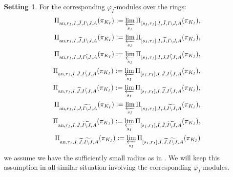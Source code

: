 \documentclass[12pt]{amsart}
\theoremstyle{definition}
\numberwithin{equation}{section}
\newtheorem{setting}[theorem]{Setting}
\begin{document}
\begin{setting}
For the corresponding $\varphi_I$-modules over the rings:
\begin{align}
\Pi_{\mathrm{an},r_I,I,\breve{J},I\backslash J,A}(\pi_{K_I}):=\varprojlim_{s_I}\Pi_{[s_I,r_I],I,\breve{J},I\backslash J,A}(\pi_{K_I}),\\	
\Pi_{\mathrm{an},r_I,I,\widetilde{J},I\backslash J,A}(\pi_{K_I}):=\varprojlim_{s_I} \Pi_{[s_I,r_I],I,\widetilde{J},I\backslash J,A}(\pi_{K_I}),\\
\Pi_{\mathrm{an},r_I,I,J,\breve{I\backslash J},A}(\pi_{K_I}):=\varprojlim_{s_I}\Pi_{[s_I,r_I],I,J,\breve{I\backslash J},A}(\pi_{K_I}),\\	
\Pi_{\mathrm{an},r_I,I,\breve{J},\breve{I\backslash J},A}(\pi_{K_I}):=\varprojlim_{s_I} \Pi_{[s_I,r_I],I,\breve{J},\breve{I\backslash J},A}(\pi_{K_I}),\\	
\Pi_{\mathrm{an},r_I,I,\widetilde{J},\breve{I\backslash J},A}(\pi_{K_I}):=\varprojlim_{s_I} \Pi_{[s_I,r_I],I,\widetilde{J},\breve{I\backslash J},A}(\pi_{K_I}),\\
\Pi_{\mathrm{an},r_I,I,J,\widetilde{I\backslash J},A}(\pi_{K_I}):=\varprojlim_{s_I} \Pi_{[s_I,r_I],I,J,\widetilde{I\backslash J},A}(\pi_{K_I}),\\	
\Pi_{\mathrm{an},r_I,I,\breve{J},\widetilde{I\backslash J},A}(\pi_{K_I}):=\varprojlim_{s_I} \Pi_{[s_I,r_I],I,\breve{J},\widetilde{I\backslash J},A}(\pi_{K_I}),\\	
\Pi_{\mathrm{an},r_I,I,\widetilde{J},\widetilde{I\backslash J},A}(\pi_{K_I}):=\varprojlim_{s_I} \Pi_{[s_I,r_I],I,\widetilde{J},\widetilde{I\backslash J},A}(\pi_{K_I})	
\end{align}	
we assume we have the sufficiently small radius as in \cite[Definition 2.2.6]{KPX}. We will keep this assumption in all similar situation involving the corresponding $\varphi_I$-modules.
\end{setting}
\end{document}
